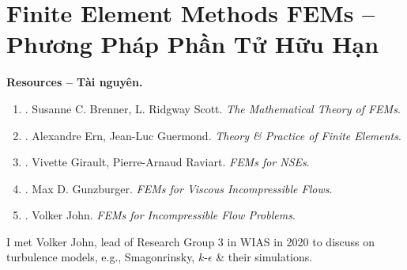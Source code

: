 \documentclass{article}
\begin{document}

\section{Finite Element Methods FEMs -- Phương Pháp Phần Tử Hữu Hạn}
\textbf{\textsf{Resources -- Tài nguyên.}}
\begin{enumerate}
	\item \cite{Brenner_Scott2008}. {\sc Susanne C. Brenner, L. Ridgway Scott}. {\it The Mathematical Theory of FEMs}.
	\item \cite{Ern_Guermond2004}. {\sc Alexandre Ern, Jean-Luc Guermond}. {\it Theory \& Practice of Finite Elements}.
	\item \cite{Girault_Raviart1986}. {\sc Vivette Girault, Pierre-Arnaud Raviart}. {\it FEMs for NSEs}.
	\item \cite{Gunzburger1989}. {\sc Max D. Gunzburger}. {\it FEMs for Viscous Incompressible Flows}.
	\item \cite{John2016}. {\sc Volker John}. {\it FEMs for Incompressible Flow Problems}.
\end{enumerate}
I met {\sc Volker John}, lead of Research Group 3 in WIAS in 2020 to discuss on turbulence models, e.g., Smagonrinsky, $k$-$\epsilon$ \& their simulations.

\end{document}
